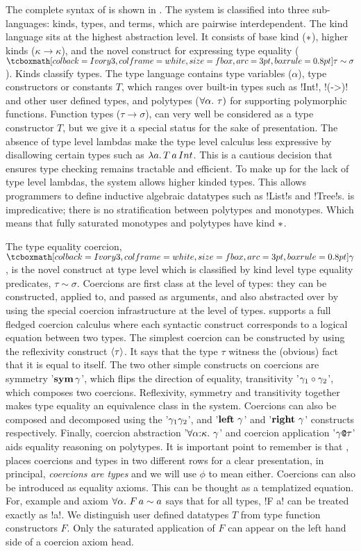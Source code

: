 \documentclass[manuscript,screen,nonacm]{acmart}
\begin{document}
The complete syntax of \SFC is shown in . The system is classified into three sub-languages: kinds, types, and terms, which are pairwise interdependent. The kind language sits at the highest abstraction level. It consists of base kind ($\ast$), higher kinds ($\kappa \to \kappa$), and the novel construct for expressing type equality ($\shl{\tau \sim \sigma}$). Kinds classify types. The type language contains type variables ($\alpha$), type constructors or constants $T$, which ranges over built-in types such as !Int!, !(->)! and other user defined types, and polytypes ($\forall\alpha.~\tau)$ for supporting polymorphic functions. Function types ($\tau \to \sigma$), can very well be considered as a type constructor $T$, but we give it a special status for the sake of presentation. The absence of type level lambdas make the type level calculus less expressive by disallowing certain types such as $\lambda a.\, T\, a\, Int$. This is a cautious decision that ensures type checking remains tractable and efficient. To make up for the lack of type level lambdas, the system allows higher kinded types. This allows programmers to define inductive algebraic datatypes such as !List!s and !Tree!s. \SFC is impredicative; there is no stratification between polytypes and monotypes. Which means that fully saturated monotypes and polytypes have kind $\ast$.

The type equality coercion, $\shl{\Co}$, is the novel construct at type level which is classified by kind level type equality predicates, $\tau\sim\sigma$. Coercions are first class at the level of types: they can be constructed, applied to, and passed as arguments, and also abstracted over by using the special coercion infrastructure at the level of types. \SFC supports a full fledged coercion calculus where each syntactic construct corresponds to a logical equation between two types. The simplest coercion can be constructed by using the reflexivity construct $\langle{\tau}\rangle$. It says that the type $\tau$ witness the (obvious) fact that it is equal to itself. The two other simple constructs on coercions are symmetry '$\textbf{sym}\,{\gamma}$', which flips the direction of equality, transitivity '${\gamma_1} \circ {\gamma_2}$', which composes two coercions. Reflexivity, symmetry and transitivity together makes type equality an equivalence class in the system. Coercions can also be composed and decomposed using the '$\gamma_1\gamma_2$', and '$\textbf{left}~\gamma$' and '$\textbf{right}~\gamma$' constructs respectively. Finally, coercion abstraction '$\forall\alpha{:}\kappa.~\gamma$' and coercion application '$\gamma\texttt{@}\tau$' aids equality reasoning on polytypes. It is important point to remember is that , places coercions and types in two different rows for a clear presentation, in principal, \emph{coercions are types} and we will use $\phi$ to mean either. Coercions can also be introduced as equality axioms. This can be thought as a templatized equation. For, example and axiom $\forall\alpha.~F\, a \sim a$ says that for all types, !F a! can be treated exactly as !a!. We distinguish user defined datatypes $T$ from type function constructors $F$. Only the saturated application of $F$ can appear on the left hand side of a coercion axiom head.
\end{document}
